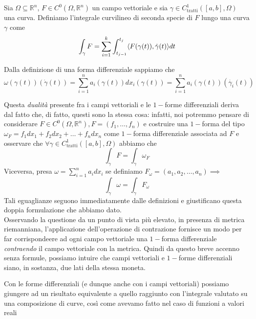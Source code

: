 \vspace{0.5cm}
\begin{definition}[\textcolor{blue}{integrale curvilineo di seconda specie di $F$ lungo una curva $\gamma$}]
	
	Sia $\Omega \subseteq \mathbb{R}^n$, $F \in C^0(\Omega, \mathbb{R}^n)$ un campo vettoriale e sia $\gamma \in C^1_{\text{tratti}}([a, b], \Omega)$ una curva. Definiamo l'integrale curvilineo di seconda specie di 
	$F$ lungo una curva $\gamma$ come 
	$$
		\int_\gamma F = \sum_{i=1}^k \int_{t_{j-1}}^{t_j} \langle F(\gamma(t)), \dot{\gamma}(t) \rangle dt
	$$
\end{definition}

\begin{remark}
Dalla definizione di una forma differenziale sappiamo che
$$
\omega(\gamma(t))(\dot{\gamma}(t)) = \sum_{i=1}^n a_i(\gamma(t))dx_i(\gamma(t)) = \sum_{i=1}^n a_i(\gamma(t))(\dot{\gamma_i}(t)) 
$$
\end{remark}

\begin{remark}
Questa \emph{dualità} presente fra i campi vettoriali e le $1-$forme differenziali deriva dal fatto che, di fatto, questi sono la stessa cosa: infatti,
noi potremmo pensare di considerare $F \in C^0(\Omega, \mathbb{R}^n), F=(f_1, \ldots, f_n)$ e costruire una $1-$forma del tipo $\omega_F=f_1 dx_1 + f_2 dx_2 + \ldots + f_ndx_n$ come $1-$forma differenziale associata ad $F$ e osservare
che $\forall \gamma \in C^1_\text{tratti}([a, b], \Omega)$ abbiamo che
$$
\int_\gamma F = \int_\gamma \omega_F
$$
Viceversa, presa $\omega = \sum\limits_{i=1}^n a_i dx_i$ se definiamo $F_\omega = (a_1, a_2, \ldots, a_n) \implies$
$$
\int_\gamma \omega = \int_\gamma F_\omega
$$
Tali eguaglianze seguono immediatamente dalle definizioni e giustificano questa doppia formulazione che abbiamo dato. \\
Osservando la questione da un punto di vista più elevato, in presenza di metrica riemanniana, l'applicazione dell'operazione di contrazione fornisce un modo per far corrispondeere ad ogni campo vettoriale
una $1-$forma differenziale \emph{contraendo} il campo vettoriale con la metrica. Quindi da questo breve accenno senza formule, possiamo intuire che campi vettoriali e $1-$forme differenziali siano, in sostanza, due lati della stessa moneta.
\end{remark}

\vspace{0.5cm}
Con le forme differenziali (e dunque anche con i campi vettoriali) possiamo giungere ad un risultato equivalente a quello raggiunto
con l'integrale valutato su una composizione di curve, così come avevamo fatto nel caso di funzioni a valori reali

